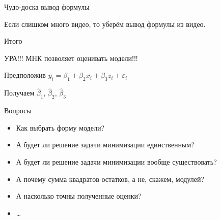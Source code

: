 \documentclass[ignorenonframetext,]{beamer}
\begin{document}
\begin{frame}{Чудо-доска вывод формулы}

Если слишком много видео, то уберём вывод формулы из видео.

\end{frame}

\begin{frame}{Итого}

УРА!!! МНК позволяет оценивать модели!!!

Предположив $y_i=\beta_1 + \beta_2 x_i +\beta_3 z_i +\varepsilon_i$

Получаем $\hat{\beta}_1$, $\hat{\beta}_2$, $\hat{\beta}_3$

\end{frame}

\begin{frame}{Вопросы}

\begin{itemize}
\item
  Как выбрать форму модели?
\item
  А будет ли решение задачи минимизации единственным?
\item
  А будет ли решение задачи минимизации вообще существовать?
\item
  А почему сумма квадратов остатков, а не, скажем, модулей?
\item
  А насколько точны полученные оценки?
\item
  \ldots{}
\end{itemize}

\end{frame}
\end{document}
